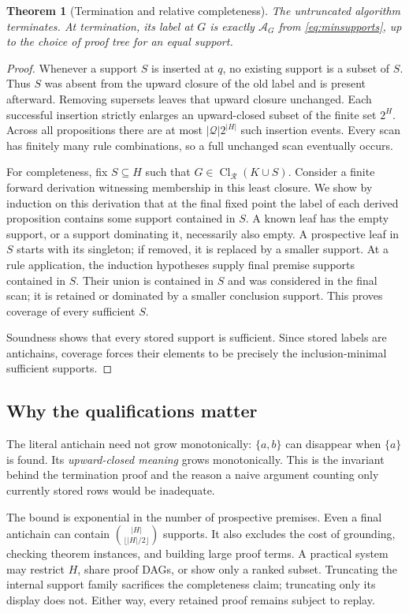 \documentclass[11pt,a4paper]{article}
\newcommand{\Cl}{\operatorname{Cl}}\newcommand{\Min}{\operatorname{Min}}
\newtheorem{theorem}{Theorem}[section]
\theoremstyle{definition}\newtheorem{definition}[theorem]{Definition}
\theoremstyle{remark}\newtheorem{remark}[theorem]{Remark}
\begin{document}
\begin{theorem}[Termination and relative completeness]\label{thm:complete}
The untruncated algorithm terminates. At termination, its label at $G$ is exactly $\mathcal A_G$ from \eqref{eq:minsupports}, up to the choice of proof tree for an equal support.
\end{theorem}
\begin{proof}
Whenever a support $S$ is inserted at $q$, no existing support is a subset of $S$. Thus $S$ was absent from the upward closure of the old label and is present afterward. Removing supersets leaves that upward closure unchanged. Each successful insertion strictly enlarges an upward-closed subset of the finite set $2^H$. Across all propositions there are at most $|\mathcal Q|2^{|H|}$ such insertion events. Every scan has finitely many rule combinations, so a full unchanged scan eventually occurs.

For completeness, fix $S\subseteq H$ such that $G\in\Cl_{\mathcal R}(K\cup S)$. Consider a finite forward derivation witnessing membership in this least closure. We show by induction on this derivation that at the final fixed point the label of each derived proposition contains some support contained in $S$. A known leaf has the empty support, or a support dominating it, necessarily also empty. A prospective leaf in $S$ starts with its singleton; if removed, it is replaced by a smaller support. At a rule application, the induction hypotheses supply final premise supports contained in $S$. Their union is contained in $S$ and was considered in the final scan; it is retained or dominated by a smaller conclusion support. This proves coverage of every sufficient $S$.

Soundness shows that every stored support is sufficient. Since stored labels are antichains, coverage forces their elements to be precisely the inclusion-minimal sufficient supports.
\end{proof}

\subsection{Why the qualifications matter}
The literal antichain need not grow monotonically: $\{a,b\}$ can disappear when $\{a\}$ is found. Its \emph{upward-closed meaning} grows monotonically. This is the invariant behind the termination proof and the reason a naive argument counting only currently stored rows would be inadequate.

The bound is exponential in the number of prospective premises. Even a final antichain can contain $\binom{|H|}{\lfloor|H|/2\rfloor}$ supports. It also excludes the cost of grounding, checking theorem instances, and building large proof terms. A practical system may restrict $H$, share proof DAGs, or show only a ranked subset. Truncating the internal support family sacrifices the completeness claim; truncating only its display does not. Either way, every retained proof remains subject to replay.
\end{document}
